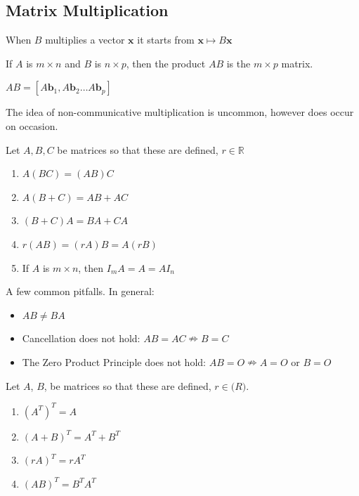 \documentclass{report}
\begin{document}
\subsection*{Matrix Multiplication}
When $B$ multiplies a vector $\mathbf{x}$ it starts from $\mathbf{x}\mapsto B\mathbf{x}$

\begin{definition}
If $A$ is $m \times n$ and $B$ is $n \times p$, then the product $AB$ is the $m \times p$ matrix.
\begin{center}
$AB = [A\mathbf{b}_1, A\mathbf{b}_2 \dots A\mathbf{b}_p]$
\end{center}
\end{definition}

\begin{remark}
The idea of non-communicative multiplication is uncommon, however does occur on occasion.
\end{remark}

\begin{theorem}
Let $A, B, C$ be matrices so that these are defined, $r \in \mathbb{R}$
\begin{enumerate}
	\item $A(BC) = (AB)C$
	\item $A(B + C) = AB + AC$
	\item $(B + C)A = BA + CA$
	\item $r(AB) = (rA)B = A(rB)$
	\item If $A$ is $m \times n$, then $I_mA = A = AI_n$
\end{enumerate}
\end{theorem}
\noindent A few common pitfalls. In general:
\begin{itemize}
	\item $AB \neq BA$
	\item Cancellation does not hold: $AB = AC \nRightarrow B = C$
	\item The Zero Product Principle does not hold: $AB = O \nRightarrow A = O$ or $B = O$
\end{itemize}
\begin{theorem}
Let $A$, $B$, be matrices so that these are defined, $r \in \mathbb(R)$.
\begin{enumerate}
	\item $(A^T)^T = A$
	\item $(A + B)^T = A^T + B^T$
	\item $(rA)^T = rA^T$
	\item $(AB)^T = B^TA^T$
\end{enumerate}
\end{theorem}
\end{document}
